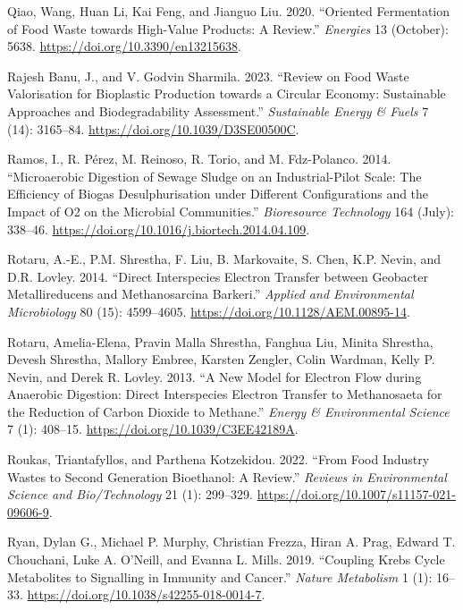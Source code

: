 \documentclass[11pt]{report}
\begin{document}
\begin{hangparas}{1.5em}{1}
\hypertarget{citeproc_bib_item_56}{Qiao, Wang, Huan Li, Kai Feng, and Jianguo Liu. 2020. “Oriented Fermentation of Food Waste towards High-Value Products: A Review.” \textit{Energies} 13 (October): 5638. \url{https://doi.org/10.3390/en13215638}.}

\hypertarget{citeproc_bib_item_57}{Rajesh Banu, J., and V. Godvin Sharmila. 2023. “Review on Food Waste Valorisation for Bioplastic Production towards a Circular Economy: Sustainable Approaches and Biodegradability Assessment.” \textit{Sustainable Energy \& Fuels} 7 (14): 3165–84. \url{https://doi.org/10.1039/D3SE00500C}.}

\hypertarget{citeproc_bib_item_58}{Ramos, I., R. Pérez, M. Reinoso, R. Torio, and M. Fdz-Polanco. 2014. “Microaerobic Digestion of Sewage Sludge on an Industrial-Pilot Scale: The Efficiency of Biogas Desulphurisation under Different Configurations and the Impact of O2 on the Microbial Communities.” \textit{Bioresource Technology} 164 (July): 338–46. \url{https://doi.org/10.1016/j.biortech.2014.04.109}.}

\hypertarget{citeproc_bib_item_59}{Rotaru, A.-E., P.M. Shrestha, F. Liu, B. Markovaite, S. Chen, K.P. Nevin, and D.R. Lovley. 2014. “Direct Interspecies Electron Transfer between Geobacter Metallireducens and Methanosarcina Barkeri.” \textit{Applied and Environmental Microbiology} 80 (15): 4599–4605. \url{https://doi.org/10.1128/AEM.00895-14}.}

\hypertarget{citeproc_bib_item_60}{Rotaru, Amelia-Elena, Pravin Malla Shrestha, Fanghua Liu, Minita Shrestha, Devesh Shrestha, Mallory Embree, Karsten Zengler, Colin Wardman, Kelly P. Nevin, and Derek R. Lovley. 2013. “A New Model for Electron Flow during Anaerobic Digestion: Direct Interspecies Electron Transfer to Methanosaeta for the Reduction of Carbon Dioxide to Methane.” \textit{Energy \& Environmental Science} 7 (1): 408–15. \url{https://doi.org/10.1039/C3EE42189A}.}

\hypertarget{citeproc_bib_item_61}{Roukas, Triantafyllos, and Parthena Kotzekidou. 2022. “From Food Industry Wastes to Second Generation Bioethanol: A Review.” \textit{Reviews in Environmental Science and Bio/Technology} 21 (1): 299–329. \url{https://doi.org/10.1007/s11157-021-09606-9}.}

\hypertarget{citeproc_bib_item_62}{Ryan, Dylan G., Michael P. Murphy, Christian Frezza, Hiran A. Prag, Edward T. Chouchani, Luke A. O’Neill, and Evanna L. Mills. 2019. “Coupling Krebs Cycle Metabolites to Signalling in Immunity and Cancer.” \textit{Nature Metabolism} 1 (1): 16–33. \url{https://doi.org/10.1038/s42255-018-0014-7}.}


\end{hangparas}
\end{document}
